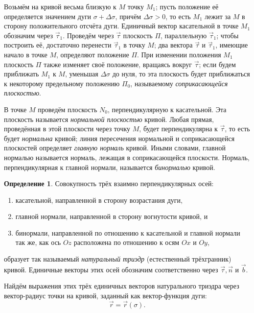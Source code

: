 \documentclass{article}
\theoremstyle{definition}
\newtheorem{definition}{Определение}[section]
\theoremstyle{plain}
\theoremstyle{remark}
\numberwithin{equation}{section}
\begin{document}
Возьмём на кривой весьма близкую к $M$ точку $M_1$; пусть положение её
определяется значением дуги $\sigma + \Delta \sigma$, причём
$\Delta \sigma > 0$, то есть $M_1$ лежит за $M$ в сторону положительного
отсчёта дуги. Единичный вектор касательной в точке $M_1$ обозначим через
$\vec{\tau}_1$. Проведём через $\vec{\tau}$ плоскость $\Pi$, параллельную
$\vec{\tau}_1$; чтобы построить её, достаточно перенести $\vec{\tau}_1$ в
точку $M$; два вектора $\vec{\tau}$ и $\vec{\tau}_1$, имеющие начало в точке
$M$, определяют положение $\Pi$. При изменении положения $M_1$ плоскость $\Pi$
также изменяет своё положение, вращаясь вокруг $\vec{\tau}$; если будем
приближать $M_1$ к $M$, уменьшая $\Delta \sigma$ до нуля, то эта плоскость
будет приближаться к некоторому предельному положению $\Pi_0$, называемому
\textit{соприкасающейся плоскостью}.

В точке $M$ проведём плоскость $N_0$, перпендикулярную к касательной. Эта
плоскость называется \textit{нормальной плоскостью} кривой. Любая прямая,
проведённая в этой плоскости через точку $M$, будет перпендикулярна к
$\vec{\tau}$, то есть будет \textit{нормальна} кривой; линия пересечения
нормальной и соприкасающейся плоскостей определяет \textit{главную нормаль}
кривой. Иными словами, главной нормалью называется нормаль, лежащая в
соприкасающейся плоскости. Нормаль, перпендикулярная к главной нормали,
называется \textit{бинормалью} кривой.

\begin{definition}
  Совокупность трёх взаимно перпендикулярных осей:
  \begin{enumerate}
    \item касательной, направленной в сторону возрастания дуги,
    \item главной нормали, направленной в сторону вогнутости кривой, и
    \item бинормали, направленной по отношению к касательной и главной нормали
      так же, как ось $Oz$ расположена по отношению к осям $Ox$ и $Oy$,
  \end{enumerate}
  образует так называемый \textit{натуральный триэдр}
  (естественный трёхгранник) кривой. Единичные векторы этих осей обозначим
  соответственно через $\vec{\tau}, \vec{n}$ и $\vec{b}$.
\end{definition}

Найдём выражения этих трёх единичных векторов натурального триэдра через
вектор-радиус точки на кривой, заданный как вектор-функция дуги:
\begin{equation}
  \vec{r} = \vec{r}(\sigma).
\end{equation}
\end{document}
